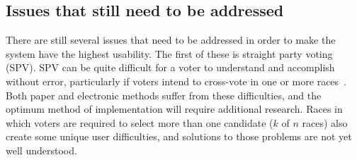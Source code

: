 \subsection{Issues that still need to be addressed}
There are still several issues that need to be addressed in order to make the system have the highest usability. The first of these is straight party voting (SPV). SPV can be quite difficult for a voter to understand and accomplish without error, particularly if voters intend to cross-vote in one or more races~\cite{campbell-ieee}. Both paper and electronic methods suffer from these difficulties, and the optimum method of implementation will require additional research. Races in which voters are required to select more than one candidate ($k$ of $n$ races) also create some unique user difficulties, and solutions to those problems are not yet well understood. 




